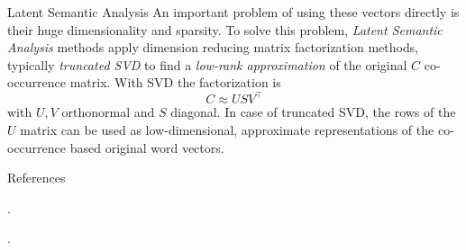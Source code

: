 \documentclass[style=upen, size=14pt]{powerdot}
\newcommand{\gold}{\color{arany}}
\theoremstyle{definition}
\begin{document}
\begin{slide}[toc=LSA]{Latent Semantic Analysis}
  An important problem of using these vectors directly is their huge
  dimensionality and sparsity. To solve this problem, \emph{\gold Latent
    Semantic Analysis} methods apply dimension reducing matrix factorization
  methods, typically \emph{truncated SVD} to find a \emph{low-rank
    approximation} of the original $C$ co-occurrence matrix. With SVD the factorization is
  $$
  C \approx USV^\intercal
  $$
  with $U,V$ orthonormal and $S$ diagonal. In case of truncated SVD, the rows of
  the $U$ matrix can be used as low-dimensional, approximate representations of
  the co-occurrence based original word vectors.
\end{slide}

\begin{slide}{References}
  
  \begin{footnotesize}

    .\medskip

    .\medskip

  \end{footnotesize}
\end{slide}


    
\end{document}
